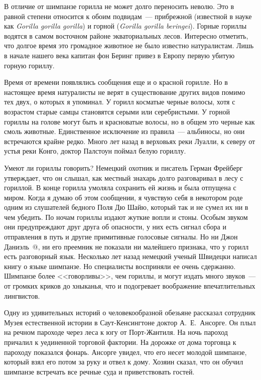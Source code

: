 \documentclass[12pt,a4paper,twoside,openany,svgnames]{memoir}
\makeatletter
\newcommand*{\rom}[1]{\expandafter\@slowromancap\romannumeral #1@}
\makeatother
\begin{document}
В отличие от шимпанзе горилла не может долго переносить неволю. Это в равной степени относится к обоим подвидам~--- прибрежной (известной в науке как \textit{Gorilla gorilla gorilla}) и горной (\textit{Gorilla gorilla beringei}). Горные гориллы водятся в самом восточном районе экваториальных лесов. Интересно отметить, что долгое время это громадное животное не было известно натуралистам. Лишь в начале нашего века капитан фон Беринг привез в Европу первую убитую горную гориллу.

Время от времени появлялись сообщения еще и о красной горилле. Но в настоящее время натуралисты не верят в существование других видов помимо тех двух, о которых я упоминал. У горилл косматые черные волосы, хотя с возрастом старые самцы становятся серыми или серебристыми. У горной гориллы на голове могут быть и красноватые волосы, но в общем это черные как смоль животные. Единственное исключение из правила~--- альбиносы, но они встречаются крайне редко. Много лет назад в верховьях реки Луалли, к северу от устья реки Конго, доктор Палстоун поймал белую гориллу.

Умеют ли гориллы говорить? Немецкий охотник и писатель Герман Фрейберг утверждает, что он слышал, как местный знахарь долго разговаривал в лесу с гориллой. В конце горилла умоляла сохранить ей жизнь и была отпущена с миром. Когда я думаю об этом сообщении, я чувствую себя в некотором роде одним из слушателей бедного Поля Дю Шайю, который так и не сумел их ни в чем убедить. По ночам гориллы издают жуткие вопли и стоны. Особым звуком они предупреждают друг друга об опасности, у них есть сигнал сбора и отправления в путь и другие примитивные голосовые сигналы. Но ни Джон Даниэль~\rom{1}, ни его преемник не показали ни малейшего признака, что у горилл есть разговорный язык. Несколько лет назад немецкий ученый Швидецки написал книгу о языке шимпанзе. Но специалисты восприняли ее очень сдержанно. Шимпанзе более <<говорливы>>, чем гориллы, и могут издать много звуков~--- от громких криков до хныканья, что и подогревает воображение впечатлительных лингвистов.

Одну из удивительных историй о человекообразной обезьяне рассказал сотрудник Музея естественной истории в Саут-Кенсингтоне доктор А.~Е.~Ансорге. Он плыл на речном пароходе через леса к югу от Порт-Жантиля. На ночь пароход причалил к уединенной торговой фактории. На дорожке от дома торговца к пароходу показался фонарь. Ансорге увидел, что его несет молодой шимпанзе, который взял его потом за руку и отвел к дому. Хозяин сказал, что он обучил шимпанзе встречать все речные суда и приветствовать гостей.
\end{document}
